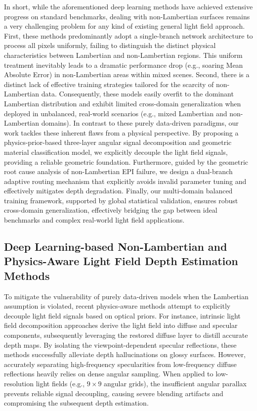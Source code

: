 \documentclass[lettersize,journal]{IEEEtran}
\begin{document}
In short, while the aforementioned deep learning methods have achieved extensive progress on standard benchmarks, dealing with non-Lambertian surfaces remains a very challenging problem for any kind of existing general light field approach. First, these methods predominantly adopt a single-branch network architecture to process all pixels uniformly, failing to distinguish the distinct physical characteristics between Lambertian and non-Lambertian regions. This uniform treatment inevitably leads to a dramatic performance drop (e.g., soaring Mean Absolute Error) in non-Lambertian areas within mixed scenes. Second, there is a distinct lack of effective training strategies tailored for the scarcity of non-Lambertian data. Consequently, these models easily overfit to the dominant Lambertian distribution and exhibit limited cross-domain generalization when deployed in unbalanced, real-world scenarios (e.g., mixed Lambertian and non-Lambertian domains). In contrast to these purely data-driven paradigms, our work tackles these inherent flaws from a physical perspective. By proposing a physics-prior-based three-layer angular signal decomposition and geometric material classification model, we explicitly decouple the light field signals, providing a reliable geometric foundation. Furthermore, guided by the geometric root cause analysis of non-Lambertian EPI failure, we design a dual-branch adaptive routing mechanism that explicitly avoids invalid parameter tuning and effectively mitigates depth degradation. Finally, our multi-domain balanced training framework, supported by global statistical validation, ensures robust cross-domain generalization, effectively bridging the gap between ideal benchmarks and complex real-world light field applications.

\subsection{Deep Learning-based Non-Lambertian and Physics-Aware Light Field Depth Estimation Methods}

To mitigate the vulnerability of purely data-driven models when the Lambertian assumption is violated, recent physics-aware methods attempt to explicitly decouple light field signals based on optical priors. For instance, intrinsic light field decomposition approaches \cite{intrinsic_light_field,signal_decoupling,physics_aware_depth} derive the light field into diffuse and specular components, subsequently leveraging the restored diffuse layer to distill accurate depth maps. By isolating the viewpoint-dependent specular reflections, these methods successfully alleviate depth hallucinations on glossy surfaces. However, accurately separating high-frequency specularities from low-frequency diffuse reflections heavily relies on dense angular sampling. When applied to low-resolution light fields (e.g., $9 \times 9$ angular grids), the insufficient angular parallax prevents reliable signal decoupling, causing severe blending artifacts and compromising the subsequent depth estimation.
\end{document}

